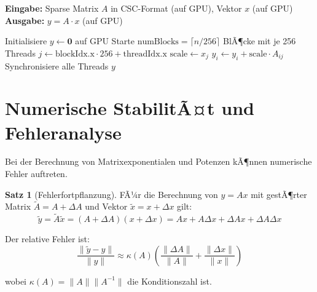 ﻿\documentclass[a4paper,12pt]{report}
\theoremstyle{definition}
\newtheorem{satz}{Satz}
\begin{document}
	\begin{algorithm}[H]
		\caption{GPU-beschleunigte sparse Matrix-Vektor-Multiplikation}
		\label{alg:gpu-sparse-matvec}
		\textbf{Eingabe:} Sparse Matrix $A$ in CSC-Format (auf GPU), Vektor $x$ (auf GPU) \\
		\textbf{Ausgabe:} $y = A \cdot x$ (auf GPU)
		\begin{algorithmic}[1]
			\State Initialisiere $y \gets \mathbf{0}$ auf GPU
			\State Starte $\text{numBlocks} = \lceil n / 256 \rceil$ BlÃ¶cke mit je 256 Threads
			\State $j \gets \text{blockIdx.x} \cdot 256 + \text{threadIdx.x}$
			\State $\text{scale} \gets x_j$
			\State $y_i \gets y_i + \text{scale} \cdot A_{ij}$ 
			\EndFor
			\EndIf
			\EndFor
			\State Synchronisiere alle Threads
			\State \Return $y$
		\end{algorithmic}
	\end{algorithm}
	
	\section{Numerische StabilitÃ¤t und Fehleranalyse}
	
	Bei der Berechnung von Matrixexponentialen und Potenzen kÃ¶nnen numerische Fehler auftreten.
	
	\begin{satz}[Fehlerfortpflanzung]
		FÃ¼r die Berechnung von $y = A x$ mit gestÃ¶rter Matrix $\tilde{A} = A + \Delta A$ und Vektor $\tilde{x} = x + \Delta x$ gilt:
		\[
		\tilde{y} = \tilde{A} \tilde{x} = (A + \Delta A)(x + \Delta x) = Ax + A \Delta x + \Delta A x + \Delta A \Delta x
		\]
		
		Der relative Fehler ist:
		\[
		\frac{\|\tilde{y} - y\|}{\|y\|} \approx \kappa(A) \left( \frac{\|\Delta A\|}{\|A\|} + \frac{\|\Delta x\|}{\|x\|} \right)
		\]
		
		wobei $\kappa(A) = \|A\| \|A^{-1}\|$ die Konditionszahl ist.
	\end{satz}
	
\end{document}
